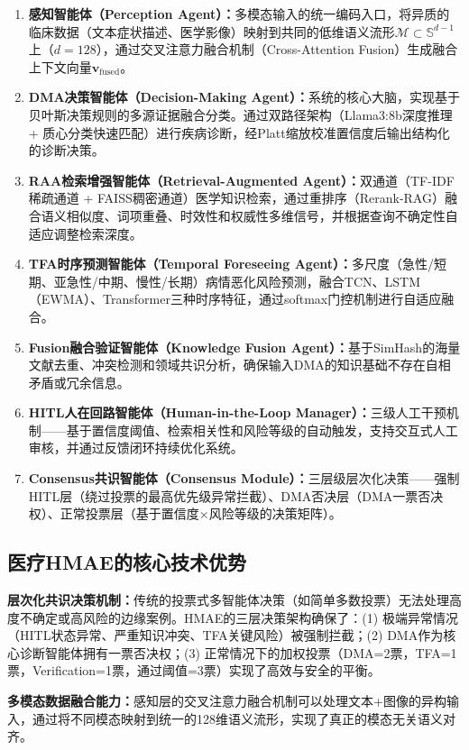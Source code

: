 \documentclass[11pt,a4paper]{ctexart}
\theoremstyle{remark}
\begin{document}
\begin{enumerate}[nosep]
\item \textbf{感知智能体（Perception Agent）：}多模态输入的统一编码入口，将异质的临床数据（文本症状描述、医学影像）映射到共同的低维语义流形$\mathcal{M} \subset \mathbb{S}^{d-1}$上（$d=128$），通过交叉注意力融合机制（Cross-Attention Fusion）生成融合上下文向量$\mathbf{v}_{\text{fused}}$。
\item \textbf{DMA决策智能体（Decision-Making Agent）：}系统的核心大脑，实现基于贝叶斯决策规则的多源证据融合分类。通过双路径架构（Llama3:8b深度推理 + 质心分类快速匹配）进行疾病诊断，经Platt缩放校准置信度后输出结构化的诊断决策。
\item \textbf{RAA检索增强智能体（Retrieval-Augmented Agent）：}双通道（TF-IDF稀疏通道 + FAISS稠密通道）医学知识检索，通过重排序（Rerank-RAG）融合语义相似度、词项重叠、时效性和权威性多维信号，并根据查询不确定性自适应调整检索深度。
\item \textbf{TFA时序预测智能体（Temporal Foreseeing Agent）：}多尺度（急性/短期、亚急性/中期、慢性/长期）病情恶化风险预测，融合TCN、LSTM（EWMA）、Transformer三种时序特征，通过softmax门控机制进行自适应融合。
\item \textbf{Fusion融合验证智能体（Knowledge Fusion Agent）：}基于SimHash的海量文献去重、冲突检测和领域共识分析，确保输入DMA的知识基础不存在自相矛盾或冗余信息。
\item \textbf{HITL人在回路智能体（Human-in-the-Loop Manager）：}三级人工干预机制——基于置信度阈值、检索相关性和风险等级的自动触发，支持交互式人工审核，并通过反馈闭环持续优化系统。
\item \textbf{Consensus共识智能体（Consensus Module）：}三层级层次化决策——强制HITL层（绕过投票的最高优先级异常拦截）、DMA否决层（DMA一票否决权）、正常投票层（基于置信度×风险等级的决策矩阵）。
\end{enumerate}

\subsection{医疗HMAE的核心技术优势}

\textbf{层次化共识决策机制：}传统的投票式多智能体决策（如简单多数投票）无法处理高度不确定或高风险的边缘案例。HMAE的三层决策架构确保了：(1) 极端异常情况（HITL状态异常、严重知识冲突、TFA关键风险）被强制拦截；(2) DMA作为核心诊断智能体拥有一票否决权；(3) 正常情况下的加权投票（DMA=2票，TFA=1票，Verification=1票，通过阈值=3票）实现了高效与安全的平衡。

\textbf{多模态数据融合能力：}感知层的交叉注意力融合机制可以处理文本+图像的异构输入，通过将不同模态映射到统一的128维语义流形，实现了真正的模态无关语义对齐。
\end{document}
